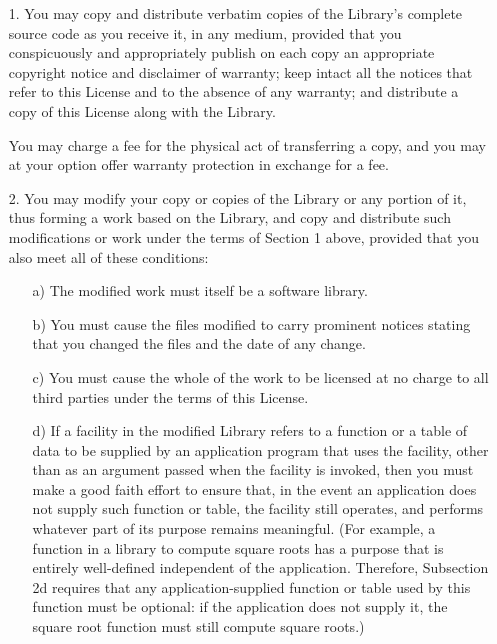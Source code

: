 \begin{multicols}{3}
\begin{itemize}
 \item[1.] You may copy and distribute verbatim copies of the
   Library's complete source code as you receive it, in any medium,
   provided that you conspicuously and appropriately publish on each
   copy an appropriate copyright notice and disclaimer of warranty;
   keep intact all the notices that refer to this License and to the
   absence of any warranty; and distribute a copy of this License
   along with the Library.

   You may charge a fee for the physical act of transferring a copy, and
   you may at your option offer warranty protection in exchange for a fee.
   
 \item[2.] You may modify your copy or copies of the Library or any
   portion of it, thus forming a work based on the Library, and copy
   and distribute such modifications or work under the terms of
   Section 1 above, provided that you also meet all of these
   conditions:

   \begin{itemize}
   \item[a)] The modified work must itself be a software library.
     
   \item[b)] You must cause the files modified to carry prominent
     notices stating that you changed the files and the date of any
     change.
     
   \item[c)] You must cause the whole of the work to be licensed at no
     charge to all third parties under the terms of this License.
     
   \item[d)] If a facility in the modified Library refers to a
     function or a table of data to be supplied by an application
     program that uses the facility, other than as an argument passed
     when the facility is invoked, then you must make a good faith
     effort to ensure that, in the event an application does not
     supply such function or table, the facility still operates, and
     performs whatever part of its purpose remains meaningful. (For
     example, a function in a library to compute square roots has a
     purpose that is entirely well-defined independent of the
     application. Therefore, Subsection 2d requires that any
     application-supplied function or table used by this function must
     be optional: if the application does not supply it, the square
     root function must still compute square roots.)
   \end{itemize}


\end{itemize}
\end{multicols}
